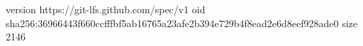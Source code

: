 version https://git-lfs.github.com/spec/v1
oid sha256:36966443f660ccfffbf5ab16765a23afe2b394e729b4f8ead2e6d8eef928ade0
size 2146

